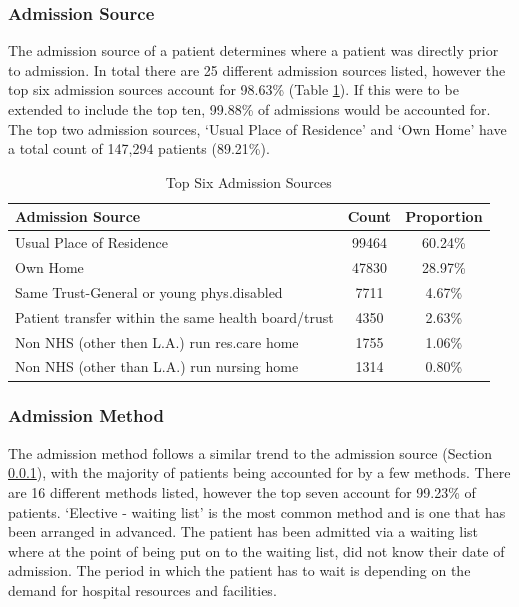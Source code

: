 \documentclass[../thesis.tex]{subfiles}
\begin{document}
\subsubsection{Admission Source}\label{Sec:AdmissionSource}
The admission source of a patient determines where a patient was directly prior to admission. In total there are 25 different admission sources listed, however the top six admission sources account for 98.63\% (Table \ref{Tab:Admission Source}). If this were to be extended to include the top ten, 99.88\% of admissions would be accounted for. The top two admission sources, `Usual Place of Residence' and `Own Home' have a total count of 147,294 patients (89.21\%).
\begin{table}[h!]
    \centering
    \begin{tabular}{lcc}\toprule
    \textbf{Admission Source} & \textbf{Count} &\textbf{Proportion} \\ \midrule
    Usual Place of Residence &	99464 & 60.24\% \\
Own Home&	47830 & 28.97\%\\
Same Trust-General or young phys.disabled&	7711 &4.67\%\\
Patient transfer within the same health board/trust	&4350 &2.63\%\\
Non NHS (other then L.A.) run res.care home&	1755 &1.06\%\\
Non NHS (other than L.A.) run nursing home&	1314 &0.80\%\\
 \bottomrule
    \end{tabular}
    \caption{Top Six Admission Sources}
    \label{Tab:Admission Source}
\end{table}

\subsubsection{Admission Method}
The admission method follows a similar trend to the admission source (Section \ref{Sec:AdmissionSource}), with the majority of patients being accounted for by a few methods. There are 16 different methods listed, however the top seven account for 99.23\% of patients. `Elective - waiting list' is the most common method and is one that has been arranged in advanced. The patient has been admitted via a waiting list where at the point of being put on to the waiting list, did not know their date of admission. The period in which the patient has to wait is depending on the demand for hospital resources and facilities.
\end{document}
